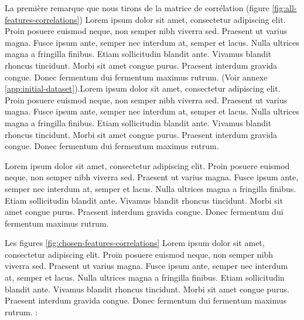 La première remarque que nous tirons de la matrice de corrélation (figure \ref{fig:all-features-correlations}) Lorem ipsum dolor sit amet, consectetur adipiscing elit. Proin posuere euismod neque, non semper nibh viverra sed. Praesent ut varius magna. Fusce ipsum ante, semper nec interdum at, semper et lacus. Nulla ultrices magna a fringilla finibus. Etiam sollicitudin blandit ante. Vivamus blandit rhoncus tincidunt. Morbi sit amet congue purus. Praesent interdum gravida congue. Donec fermentum dui fermentum maximus rutrum. (Voir annexe \ref{app:initial-dataset}).Lorem ipsum dolor sit amet, consectetur adipiscing elit. Proin posuere euismod neque, non semper nibh viverra sed. Praesent ut varius magna. Fusce ipsum ante, semper nec interdum at, semper et lacus. Nulla ultrices magna a fringilla finibus. Etiam sollicitudin blandit ante. Vivamus blandit rhoncus tincidunt. Morbi sit amet congue purus. Praesent interdum gravida congue. Donec fermentum dui fermentum maximus rutrum.

\medskip

Lorem ipsum dolor sit amet, consectetur adipiscing elit. Proin posuere euismod neque, non semper nibh viverra sed. Praesent ut varius magna. Fusce ipsum ante, semper nec interdum at, semper et lacus. Nulla ultrices magna a fringilla finibus. Etiam sollicitudin blandit ante. Vivamus blandit rhoncus tincidunt. Morbi sit amet congue purus. Praesent interdum gravida congue. Donec fermentum dui fermentum maximus rutrum.

\medskip

Les figures \ref{fig:chosen-features-correlations} Lorem ipsum dolor sit amet, consectetur adipiscing elit. Proin posuere euismod neque, non semper nibh viverra sed. Praesent ut varius magna. Fusce ipsum ante, semper nec interdum at, semper et lacus. Nulla ultrices magna a fringilla finibus. Etiam sollicitudin blandit ante. Vivamus blandit rhoncus tincidunt. Morbi sit amet congue purus. Praesent interdum gravida congue. Donec fermentum dui fermentum maximus rutrum. : \\


